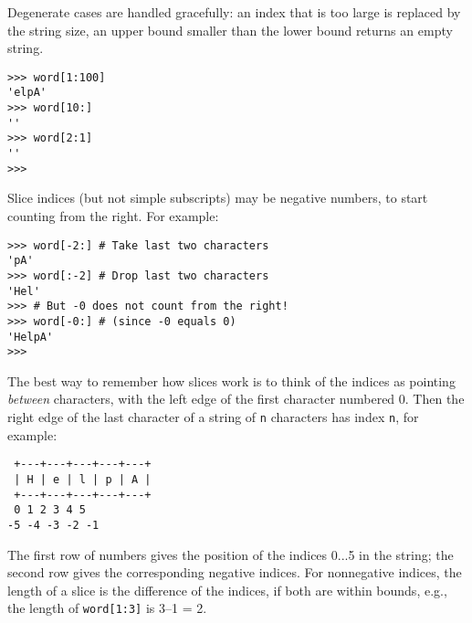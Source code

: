 Degenerate cases are handled gracefully: an index that is too large is
replaced by the string size, an upper bound smaller than the lower bound
returns an empty string.
\bcode\begin{verbatim}
>>> word[1:100]
'elpA'
>>> word[10:]
''
>>> word[2:1]
''
>>>
\end{verbatim}\ecode
Slice indices (but not simple subscripts) may be negative numbers, to
start counting from the right.
For example:
\bcode\begin{verbatim}
>>> word[-2:] # Take last two characters
'pA'
>>> word[:-2] # Drop last two characters
'Hel'
>>> # But -0 does not count from the right!
>>> word[-0:] # (since -0 equals 0)
'HelpA'
>>>
\end{verbatim}\ecode
The best way to remember how slices work is to think of the indices as
pointing
{\em between}
characters, with the left edge of the first character numbered 0.
Then the right edge of the last character of a string of
{\tt n}
characters has index
{\tt n},
for example:
\bcode\begin{verbatim}
 +---+---+---+---+---+
 | H | e | l | p | A |
 +---+---+---+---+---+
 0 1 2 3 4 5
-5 -4 -3 -2 -1
\end{verbatim}\ecode
The first row of numbers gives the position of the indices 0...5 in the
string; the second row gives the corresponding negative indices.
For nonnegative indices, the length of a slice is the difference of the
indices, if both are within bounds,
e.g.,
the length of
{\tt word[1:3]}
is 3--1 = 2.

